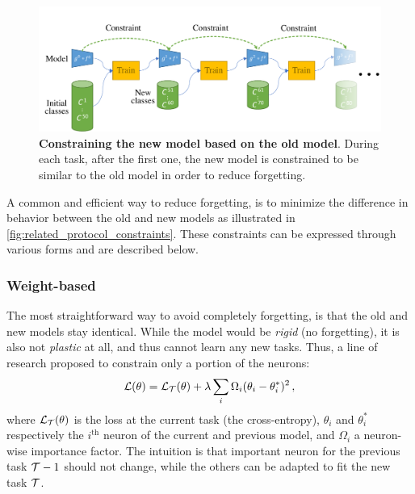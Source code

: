 \begin{figure}[tb]
      \begin{center}
            \includegraphics[width=1.0\linewidth]{images/related/constraints}
      \end{center}
      \caption{\textbf{Constraining the new model based on the old model}. During each task, after
            the first one, the new model is constrained to be similar to the old model in order to reduce
            forgetting.}
      \label{fig:related_protocol_constraints}
\end{figure}

A common and efficient way to reduce forgetting, is to minimize the difference in behavior between
the old and new models as illustrated in \autoref{fig:related_protocol_constraints}. These constraints can be
expressed through various forms and are described below.

\subsubsection{Weight-based}
\label{sec:related_regul_weight}


The most straightforward way to avoid completely forgetting, is that the old and new
models stay identical. While the model would be \textit{rigid} (no forgetting), it is also not
\textit{plastic} at all, and thus cannot learn any new tasks. Thus, a line of research proposed to
constrain only a portion of the neurons:
%
\begin{equation}
      \mathcal{L}(\theta) = \mathcal{L}_{\mathcal{T}}(\theta) + \lambda \sum_i \Omega_i (\theta_i - \theta_i^*)^2\,,
      \label{eq:related_weight_constraint}
\end{equation}
%
where $\mathcal{L}_{\mathcal{T}}(\theta)$ is the loss at the current task (\eg the cross-entropy), $\theta_i$ and
$\theta_i^*$ respectively the $i^\text{th}$ neuron of the current and previous model, and $\Omega_i$
a neuron-wise importance factor. The intuition is that important neuron for the previous task $\mathcal{T}-1$ should not
change, while the others can be adapted to fit the new task $\mathcal{T}$.

